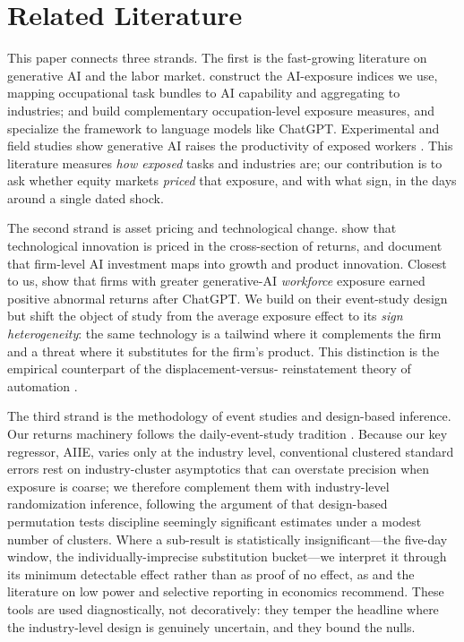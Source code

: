 \documentclass[12pt]{article}
\begin{document}
\section{Related Literature}\label{sec:lit}
This paper connects three strands. The first is the fast-growing literature on generative AI
and the labor market. \citet{felten2021} construct the AI-exposure indices we use, mapping
occupational task bundles to AI capability and aggregating to industries; \citet{webb2020} and
\citet{eloundou2024} build complementary occupation-level exposure measures, and
\citet{felten2023} specialize the framework to language models like ChatGPT.
Experimental and field studies show generative AI raises the productivity of exposed workers
\citep{brynjolfsson2023,noy2023}. This literature measures \emph{how exposed} tasks and
industries are; our contribution is to ask whether equity markets \emph{priced} that exposure,
and with what sign, in the days around a single dated shock.

The second strand is asset pricing and technological change. \citet{kogan2017} show that
technological innovation is priced in the cross-section of returns, and \citet{babina2024}
document that firm-level AI investment maps into growth and product innovation. Closest to us,
\citet{eisfeldt2023} show that firms with greater generative-AI \emph{workforce} exposure earned
positive abnormal returns after ChatGPT. We build on their event-study design but shift the
object of study from the average exposure effect to its \emph{sign heterogeneity}: the same
technology is a tailwind where it complements the firm and a threat where it substitutes for the
firm's product. This distinction is the empirical counterpart of the displacement-versus-
reinstatement theory of automation \citep{acemoglu2019,autor2003}.

The third strand is the methodology of event studies and design-based inference. Our returns
machinery follows the daily-event-study tradition \citep{brown1985,mackinlay1997}. Because our
key regressor, AIIE, varies only at the industry level, conventional clustered standard errors
rest on industry-cluster asymptotics that can overstate precision when exposure is coarse; we
therefore complement them with industry-level randomization inference, following the argument of
\citet{young2019} that design-based permutation tests discipline seemingly significant estimates
under a modest number of clusters. Where a sub-result is statistically insignificant---the
five-day window, the individually-imprecise substitution bucket---we interpret it through its
minimum detectable effect rather than as proof of no effect, as \citet{abadie2020} and the
literature on low power and selective reporting in economics \citep{ioannidis2017} recommend.
These tools are used diagnostically, not decoratively: they temper the headline where the
industry-level design is genuinely uncertain, and they bound the nulls.
\end{document}
